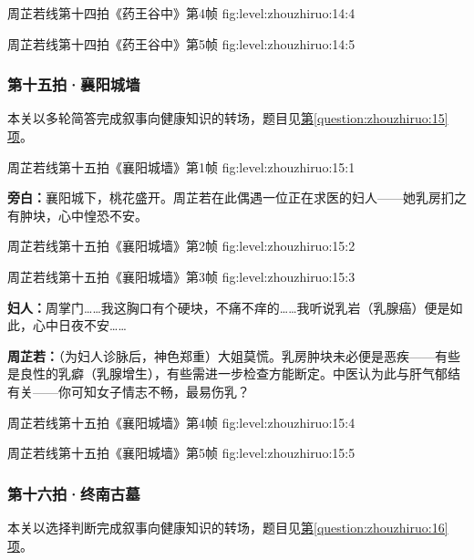   {周芷若线第十四拍《药王谷中》第4帧}
  {fig:level:zhouzhiruo:14:4}
  {\scriptsize}
  {\mbox{}}

\clearpage

  {周芷若线第十四拍《药王谷中》第5帧}
  {fig:level:zhouzhiruo:14:5}
  {\scriptsize}
  {\mbox{}}

\subsubsection{第十五拍·襄阳城墙}\label{plot:zhouzhiruo:15}
本关以多轮简答完成叙事向健康知识的转场，题目见\hyperref[question:zhouzhiruo:15]{第\ref*{question:zhouzhiruo:15}项}。

  {周芷若线第十五拍《襄阳城墙》第1帧}
  {fig:level:zhouzhiruo:15:1}
  {\scriptsize}
  {\textbf{旁白：}襄阳城下，桃花盛开。周芷若在此偶遇一位正在求医的妇人——她乳房扪之有肿块，心中惶恐不安。\par}

  {周芷若线第十五拍《襄阳城墙》第2帧}
  {fig:level:zhouzhiruo:15:2}
  {\scriptsize}
  {\mbox{}}

\clearpage

  {周芷若线第十五拍《襄阳城墙》第3帧}
  {fig:level:zhouzhiruo:15:3}
  {\scriptsize}
  {\textbf{妇人：}周掌门……我这胸口有个硬块，不痛不痒的……我听说乳岩（乳腺癌）便是如此，心中日夜不安……\par
\textbf{周芷若：}（为妇人诊脉后，神色郑重）大姐莫慌。乳房肿块未必便是恶疾——有些是良性的乳癖（乳腺增生），有些需进一步检查方能断定。中医认为此与肝气郁结有关——你可知女子情志不畅，最易伤乳？\par}

  {周芷若线第十五拍《襄阳城墙》第4帧}
  {fig:level:zhouzhiruo:15:4}
  {\scriptsize}
  {\mbox{}}

  {周芷若线第十五拍《襄阳城墙》第5帧}
  {fig:level:zhouzhiruo:15:5}
  {\scriptsize}
  {\mbox{}}

\clearpage

\subsubsection{第十六拍·终南古墓}\label{plot:zhouzhiruo:16}
本关以选择判断完成叙事向健康知识的转场，题目见\hyperref[question:zhouzhiruo:16]{第\ref*{question:zhouzhiruo:16}项}。

